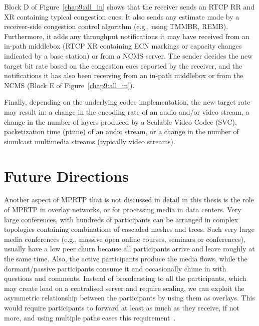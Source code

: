 Block D of Figure~\ref{chap9:all_in} shows that the receiver sends an RTCP
RR and XR containing typical congestion cues. It also sends any estimate made
by a receiver-side congestion control algorithm (e.g., using TMMBR, REMB).
Furthermore, it adds any throughput notifications it may have received from an
in-path middlebox (RTCP XR containing ECN markings or capacity changes
indicated by a base station) or from a NCMS server. The sender decides the new
target bit rate based on the congestion cues reported by the receiver, and the
notifications it has also been receiving from an in-path middlebox or from the
NCMS (Block E of Figure~\ref{chap9:all_in}).


Finally, depending on the underlying codec implementation, the new target rate
may result in: a change in the encoding rate of an audio and/or video stream,
a change in the number of layers produced by a Scalable Video Codec (SVC),
packetization time (ptime) of an audio stream, or a change in the number of
simulcast multimedia streams (typically video streams).

\section{Future Directions}

Another aspect of MPRTP that is not discussed in detail in this thesis is the
role of MPRTP in overlay networks, or for processing media in data centers. Very
large conferences, with hundreds of participants can be arranged in complex
topologies containing combinations of cascaded meshes and trees. Such very
large media conferences (e.g., massive open online courses, seminars or
conferences), usually have a low peer churn because all participants arrive
and leave roughly at the same time. Also, the active participants produce the
media flows, while the dormant/passive participants consume it and occasionally
chime in with questions and comments. Instead of broadcasting to all the
participants, which may create load on a centralised server and require
scaling, we can exploit the asymmetric relationship between the participants
by using them as overlays. This would require participants to forward at least
as much as they receive, if not more, and using multiple paths eases this
requirement~\cite{Noh2008,Li2010a,Globisch:AsymGrpComm}.



